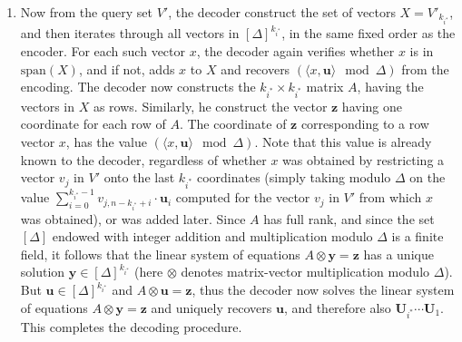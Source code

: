 \documentclass[letterpaper]{article}
\newcommand{\is}{{i^*}}
\newcommand{\vecspan}{\textrm{span}}
\newcommand{\VecSet}{X}
\newcommand{\Matrix}{A}
\newcommand{\uv}{\textbf{u}}
\newcommand{\y}{\textbf{y}}
\newcommand{\U}{\textbf{U}}
\newcommand{\z}{\textbf{z}}
\begin{document}
\begin{enumerate}
\item Now from the query set $V'$, the decoder construct the set of
  vectors $\VecSet=V'_{k_\is}$, and then iterates through all vectors
  in $[\Delta]^{k_\is}$, in the same fixed order as the encoder. For
  each such vector $x$, the decoder again verifies whether $x$ is in
  $\vecspan(\VecSet)$, and if not, adds $x$ to $\VecSet$ and recovers
  $(\langle x,\uv \rangle \mod \Delta)$ from the encoding. The decoder
  now constructs the $k_\is \times k_\is$ matrix $\Matrix$, having the
  vectors in $\VecSet$ as rows. Similarly, he construct the vector
  $\z$ having one coordinate for each row of $\Matrix$. The coordinate
  of $\z$ corresponding to a row vector $x$, has the value $(\langle
  x, \uv \rangle \mod \Delta)$. Note that this value is already known
  to the decoder, regardless of whether $x$ was obtained by
  restricting a vector $v_j$ in $V'$ onto the last $k_\is$ coordinates
  (simply taking modulo $\Delta$ on the value $\sum_{i=0}^{k_\is-1}
  v_{j,n-k_\is+i} \cdot \uv_i$ computed for the vector $v_j$ in $V'$
  from which $x$ was obtained), or was added later. Since $\Matrix$
  has full rank, and since the set $[\Delta]$ endowed with integer
  addition and multiplication modulo $\Delta$ is a finite field, it
  follows that the linear system of equations $\Matrix \otimes \y = \z$ has a
  unique solution $\y \in [\Delta]^{k_\is}$ (here $\otimes$ denotes
  matrix-vector multiplication modulo $\Delta$). But $\uv \in
  [\Delta]^{k_\is}$ and $\Matrix \otimes \uv = \z$, thus the decoder
  now solves the linear system of equations $\Matrix \otimes \y = \z$
  and uniquely recovers $\uv$, and therefore also $\U_\is \cdots
  \U_1$. This completes the decoding procedure.
\end{enumerate}
\end{document}
